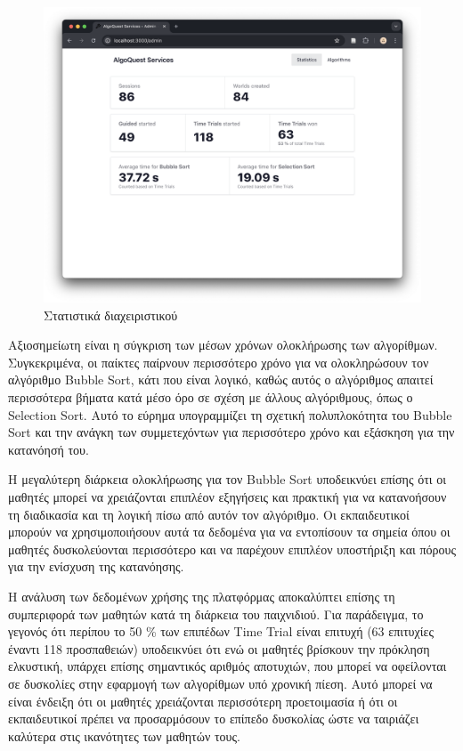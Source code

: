 \begin{figure}[H]
    \centering
    \includegraphics[width=0.7\linewidth]{sections/5/2/images/admin_dashboard_statistics}
    \caption{Στατιστικά διαχειριστικού}
    \label{fig:admin_dashboard_statistics_results}
\end{figure}

Αξιοσημείωτη είναι η σύγκριση των μέσων χρόνων ολοκλήρωσης των αλγορίθμων. Συγκεκριμένα, οι παίκτες παίρνουν περισσότερο χρόνο για να ολοκληρώσουν τον αλγόριθμο Bubble Sort, κάτι που είναι λογικό, καθώς αυτός ο αλγόριθμος απαιτεί περισσότερα βήματα κατά μέσο όρο σε σχέση με άλλους αλγόριθμους, όπως ο Selection Sort. Αυτό το εύρημα υπογραμμίζει τη σχετική πολυπλοκότητα του Bubble Sort και την ανάγκη των συμμετεχόντων  για περισσότερο χρόνο και εξάσκηση για την κατανόησή του.

Η μεγαλύτερη διάρκεια ολοκλήρωσης για τον Bubble Sort υποδεικνύει επίσης ότι οι μαθητές μπορεί να χρειάζονται επιπλέον εξηγήσεις και πρακτική για να κατανοήσουν τη διαδικασία και τη λογική πίσω από αυτόν τον αλγόριθμο. Οι εκπαιδευτικοί μπορούν να χρησιμοποιήσουν αυτά τα δεδομένα για να εντοπίσουν τα σημεία όπου οι μαθητές δυσκολεύονται περισσότερο και να παρέχουν επιπλέον υποστήριξη και πόρους για την ενίσχυση της κατανόησης.

Η ανάλυση των δεδομένων χρήσης της πλατφόρμας αποκαλύπτει επίσης τη συμπεριφορά των μαθητών κατά τη διάρκεια του παιχνιδιού. Για παράδειγμα, το γεγονός ότι περίπου το 50 \% των επιπέδων Time Trial είναι επιτυχή (63 επιτυχίες έναντι 118 προσπαθειών) υποδεικνύει ότι ενώ οι μαθητές βρίσκουν την πρόκληση ελκυστική, υπάρχει επίσης σημαντικός αριθμός αποτυχιών, που μπορεί να οφείλονται σε δυσκολίες στην εφαρμογή των αλγορίθμων υπό χρονική πίεση. Αυτό μπορεί να είναι ένδειξη ότι οι μαθητές χρειάζονται περισσότερη προετοιμασία ή ότι οι εκπαιδευτικοί πρέπει να προσαρμόσουν το επίπεδο δυσκολίας ώστε να ταιριάζει καλύτερα στις ικανότητες των μαθητών τους.

